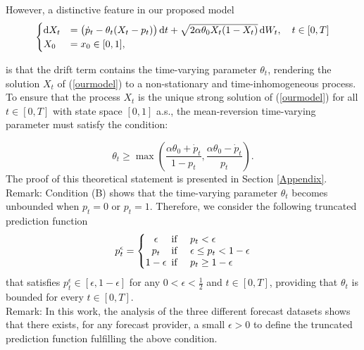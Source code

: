 \documentclass[11pt]{article}
\theoremstyle{definition}
\begin{document}
However, a distinctive feature in our proposed model 
\begin{equation}
\begin{cases}
    \dif X_t&= \left(\dot{p}_t  - \theta_t (X_t - p_t) \right) \dif t +\sqrt{2 \alpha \theta_0 X_t (1 - X_t)} \dif W_t, \quad t \in [0,T]  \\
   X_0 &=  x_0\in [0,1] ,
\end{cases}
\label{ourmodel}
\end{equation}

is that the drift term contains the time-varying parameter $\theta_t$, rendering the solution $X_t$ of (\ref{ourmodel}) to a non-stationary and time-inhomogeneous process. To ensure that the process $X_t$ is the unique strong solution of (\ref{ourmodel}) for all $t \in [0,T]$ with state space $[0,1]$ a.s., the mean-reversion time-varying parameter must satisfy the condition:

\begin{equation}
\theta_t\geq \max\left(\frac{\alpha\theta_0+\dot p_t}{1-p_t},\frac{\alpha\theta_0-\dot p_t}{p_t}\right)\tag{B}. 
\end{equation} \label{condB}
The proof of this theoretical statement is presented in Section \ref{Appendix}. \\

Remark: Condition (B) shows that the time-varying parameter $\theta_t$ becomes unbounded when $p_t = 0$ or $p_t = 1$. Therefore, we consider the following truncated prediction function
\begin{equation}
  p_t^{\epsilon} = \left\{
  \begin{array}{@{}cl@{}}
    \epsilon \!\!\!&\text{if \quad} p_t  < \epsilon  \\
    p_t  \!\!\!&\text{if \quad}  \epsilon \leq p_t < 1 - \epsilon \\
    1 - \epsilon  \!\!\!&\text{if \quad}  p_t \geq 1 - \epsilon
 \end{array}\right.  \label{corrforecast}
\end{equation}
that satisfies $p_t^{\epsilon} \in [\epsilon, 1 - \epsilon]$ for any $0 < \epsilon < \frac{1}{2}$ and $t \in [0,T]$, providing that $\theta_t$ is bounded for every $t \in [0,T]$. \\

Remark: In this work, the analysis of the three different forecast datasets shows that there exists, for any forecast provider, a small $\epsilon >0$ to define the truncated prediction function fulfilling the above condition. \\
\end{document}
